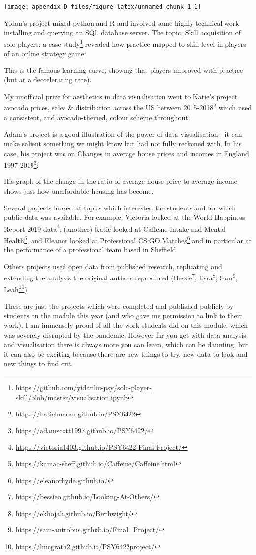 \documentclass[
  12pt,
  a5paper,
]{book}
\DeclareRobustCommand{\href}[2]{#2\footnote{\url{#1}}}
\begin{document}
\begin{center}\texttt{[image: appendix-D\_files/figure-latex/unnamed-chunk-1-1]} \end{center}

Yidan's project mixed python and R and involved some highly technical work installing and querying an SQL database server. The topic, \href{https://github.com/yidanliu-psy/solo-player-skill/blob/master/visualisation.ipynb}{Skill acquisition of solo players: a case study} revealed how practice mapped to skill level in players of an online strategy game:

This is the famous learning curve, showing that players improved with practice (but at a deccelerating rate).

My unofficial prize for aesthetics in data visualisation went to Katie's project \href{https://katielmoran.github.io/PSY6422}{avocado prices, sales \& distribution across the US between 2015-2018} which used a consistent, and avocado-themed, colour scheme throughout:

Adam's project is a good illustration of the power of data visualisation - it can make salient something we might know but had not fully reckoned with. In his case, his project was on \href{https://adamscott1997.github.io/PSY6422/}{Changes in average house prices and incomes in England 1997-2019}:

His graph of the change in the ratio of average house price to average income shows just how unaffordable housing has become.

Several projects looked at topics which interested the students and for which public data was available. For example, Victoria looked at the \href{https://victoria1403.github.io/PSY6422-Final-Project/}{World Happiness Report 2019 data}, (another) Katie looked at \href{https://kamac-sheff.github.io/Caffeine/Caffeine.html}{Caffeine Intake and Mental Health}, and Eleanor looked at \href{https://eleanorhyde.github.io/}{Professional CS:GO Matches} and in particular at the performance of a professional team based in Sheffield.

Others projects used open data from published research, replicating and extending the analysis the original authors reproduced (\href{https://bessieo.github.io/Looking-At-Others/}{Bessie}, \href{https://ekhojah.github.io/Birthwight/}{Esra}, \href{https://sam-antrobus.github.io/Final_Project/}{Sam}, \href{https://lmcgrath2.github.io/PSY6422project/}{Leah})

These are just the projects which were completed and published publicly by students on the module this year (and who gave me permission to link to their work). I am immensely proud of all the work students did on this module, which was severely disrupted by the pandemic. However far you get with data analysis and visualisation there is always more you can learn, which can be daunting, but it can also be exciting because there are new things to try, new data to look and new things to find out.
\end{document}

